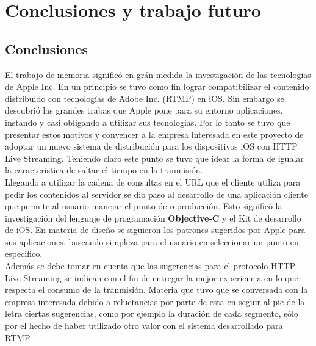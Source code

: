 
\chapter{Conclusiones y trabajo futuro}


\section{Conclusiones}

El trabajo de memoria significó en grán medida la investigación de las tecnologias de Apple Inc. En un principio se tuvo como fin lograr compatibilizar el contenido distribuido con tecnologías de Adobe Inc. (RTMP) en iOS. 
Sin embargo se descubrió las grandes trabas que Apple pone para su entorno aplicaciones, instando y casi obligando a utilizar sus tecnologias. 
Por lo tanto se tuvo que presentar estos motivos y convencer a la empresa interesada en este proyecto de adoptar un nuevo sistema de distribución para los dispositivos iOS con HTTP Live Streaming. Teniendo claro este punto se tuvo que idear la forma de igualar la caracteristica de saltar el tiempo en la tranmisión. \\ 

Llegando a utilizar la cadena de consultas en el URL que el cliente utiliza para pedir los contenidos al servidor se dio paso al desarrollo de una aplicación cliente que permite al usuario manejar el punto de reproducción. Esto significó la investigación del lenguaje de programación \textbf{Objective-C} y el Kit de desarrollo de iOS. En materia de diseño se siguieron los patrones sugeridos por Apple para sus aplicaciones, buscando simpleza para el usuario en seleccionar un punto en especifico.\\

Además se debe tomar en cuenta que las sugerencias para el protocolo HTTP Live Streaming se indican con el fin de entregar la mejor experiencia en lo que respecta el consumo de la tranmisión. Materia que tuvo que se conversada con la empresa interesada debido a reluctancias por parte de esta en seguir al pie de la letra ciertas sugerencias, como por ejemplo la duración de cada segmento, sólo por el hecho de haber utilizado otro valor con el sistema desarrollado para RTMP.\\

